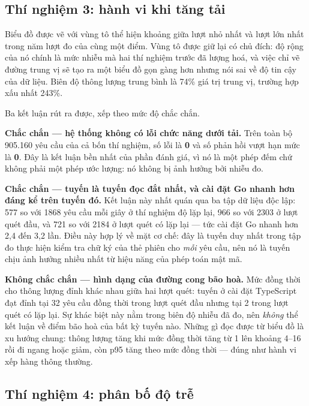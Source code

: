 \subsection{Thí nghiệm 3: hành vi khi tăng tải}





Biểu đồ được vẽ với vùng tô thể hiện khoảng giữa lượt nhỏ nhất và lượt lớn nhất trong năm lượt đo của cùng một điểm. Vùng tô được giữ lại có chủ đích: độ rộng của nó chính là mức nhiễu mà hai thí nghiệm trước đã lượng hoá, và việc chỉ vẽ đường trung vị sẽ tạo ra một biểu đồ gọn gàng hơn nhưng nói sai về độ tin cậy của dữ liệu. Biên độ thông lượng trung bình là 74\% giá trị trung vị, trường hợp xấu nhất 243\%.

Ba kết luận rút ra được, xếp theo mức độ chắc chắn.

\noindent \textbf{Chắc chắn --- hệ thống không có lỗi chức năng dưới tải.} Trên toàn bộ 905.160 yêu cầu của cả bốn thí nghiệm, số lỗi là \textbf{0} và số phản hồi vượt hạn mức là \textbf{0}. Đây là kết luận bền nhất của phần đánh giá, vì nó là một phép đếm chứ không phải một phép ước lượng: nó không bị ảnh hưởng bởi nhiễu đo.

\noindent \textbf{Chắc chắn --- tuyến  là tuyến đọc đắt nhất, và cài đặt Go nhanh hơn đáng kể trên tuyến đó.} Kết luận này nhất quán qua ba tập dữ liệu độc lập: 577 so với 1868 yêu cầu mỗi giây ở thí nghiệm độ lặp lại, 966 so với 2303 ở lượt quét đầu, và 721 so với 2184 ở lượt quét có lặp lại --- tức cài đặt Go nhanh hơn 2,4 đến 3,2 lần. Điều này hợp lý về mặt cơ chế: đây là tuyến duy nhất trong tập đo thực hiện kiểm tra chữ ký của thẻ phiên cho \emph{mỗi} yêu cầu, nên nó là tuyến chịu ảnh hưởng nhiều nhất từ hiệu năng của phép toán mật mã.

\noindent \textbf{Không chắc chắn --- hình dạng của đường cong bão hoà.} Mức đồng thời cho thông lượng đỉnh khác nhau giữa hai lượt quét: tuyến  ở cài đặt TypeScript đạt đỉnh tại 32 yêu cầu đồng thời trong lượt quét đầu nhưng tại 2 trong lượt quét có lặp lại. Sự khác biệt này nằm trong biên độ nhiễu đã đo, nên \emph{không} thể kết luận về điểm bão hoà của bất kỳ tuyến nào. Những gì đọc được từ biểu đồ là xu hướng chung: thông lượng tăng khi mức đồng thời tăng từ 1 lên khoảng 4--16 rồi đi ngang hoặc giảm, còn p95 tăng theo mức đồng thời --- đúng như hành vi xếp hàng thông thường.

\subsection{Thí nghiệm 4: phân bố độ trễ}

